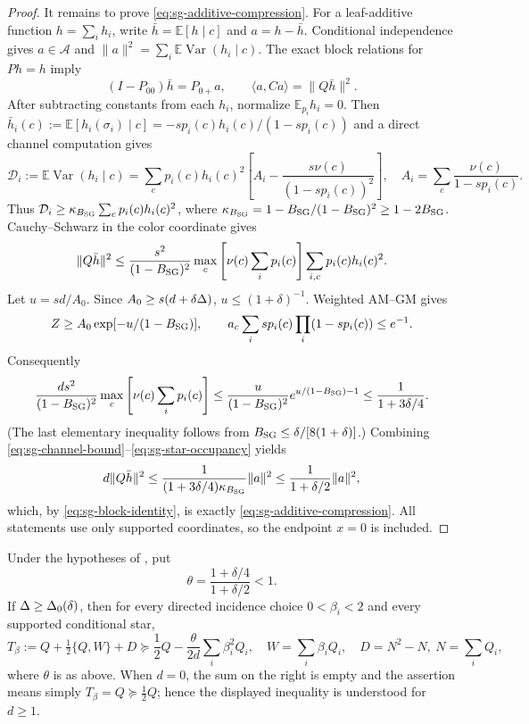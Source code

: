 \begin{proof}
It remains to prove \eqref{eq:sg-additive-compression}.  For a leaf-additive function
$h=\sum_i h_i$, write $\bar h=\mathbb E[h\mid c]$ and $a=h-\bar h$.
Conditional independence gives
$a\in\mathcal A$ and
$\|a\|^2=\sum_i\mathbb E\operatorname{Var}(h_i\mid c)$.  The exact block
relations for $Ph=h$ imply
\begin{equation}\label{eq:sg-block-identity}
 (I-P_{00})\bar h=P_{0+}a,\qquad
 \langle a,Ca\rangle=\|Q\bar h\|^2.
\end{equation}
After subtracting constants from each $h_i$, normalize
$\mathbb E_{p_i}h_i=0$.  Then
$\bar h_i(c):=\mathbb E[h_i(\sigma_i)\mid c]=-sp_i(c)h_i(c)/(1-sp_i(c))$ and a direct channel computation gives
\[
 \mathcal D_i:=\mathbb E\operatorname{Var}(h_i\mid c)
 =\sum_cp_i(c)h_i(c)^2
 \left[A_i-\frac{s\nu(c)}{(1-sp_i(c))^2}\right],\quad
 A_i=\sum_c\frac{\nu(c)}{1-sp_i(c)}.
\]
Thus $\mathcal D_i\ge\kappa_{B_{\rm SG}}\sum_cp_i(c)h_i(c)^2$, where
$\kappa_{B_{\rm SG}}=1-B_{\rm SG}/(1-B_{\rm SG})^2\ge1-2B_{\rm SG}$.  Cauchy--Schwarz in the color coordinate gives
\begin{equation}\label{eq:sg-channel-bound}
 \|Q\bar h\|^2\le \frac{s^2}{(1-B_{\rm SG})^2}
 \max_c\left[\nu(c)\sum_i p_i(c)\right]
 \sum_{i,c}p_i(c)h_i(c)^2.
\end{equation}
Let $u=sd/A_0$.  Since $A_0\ge s(d+\delta\Delta)$,
$u\le(1+\delta)^{-1}$.  Weighted AM--GM gives
\[
 Z\ge A_0\exp[-u/(1-B_{\rm SG})],\qquad
 a_c\sum_i sp_i(c)\prod_i(1-sp_i(c))\le e^{-1}.
\]
Consequently
\begin{equation}\label{eq:sg-star-occupancy}
 \frac{ds^2}{(1-B_{\rm SG})^2}\max_c\left[\nu(c)\sum_i p_i(c)\right]
 \le \frac{u}{(1-B_{\rm SG})^2}e^{u/(1-B_{\rm SG})-1}
 \le \frac{1}{1+3\delta/4}.
\end{equation}
(The last elementary inequality follows from $B_{\rm SG}\le\delta/[8(1+\delta)]$.)
Combining \eqref{eq:sg-channel-bound}--\eqref{eq:sg-star-occupancy} yields
\[
 d\|Q\bar h\|^2\le \frac{1}{(1+3\delta/4)\kappa_{B_{\rm SG}}}\|a\|^2
 \le \frac{1}{1+\delta/2}\|a\|^2,
\]
which, by \eqref{eq:sg-block-identity}, is exactly \eqref{eq:sg-additive-compression}.  All statements use only supported
coordinates, so the endpoint $x=0$ is included.
\end{proof}

\begin{lemma}
\label{lem:girth5-star-incidence}
Under the hypotheses of , put
\[
 \theta=\frac{1+\delta/4}{1+\delta/2}<1.
\]
If $\Delta\ge\Delta_0(\delta)$, then for every directed incidence choice
$0<\beta_i<2$ and every supported conditional star,
\begin{equation}\label{eq:sg-star-incidence}
 T_\beta:=Q+\tfrac12\{Q,W\}+D
 \succeq \frac{1}{2}Q-\frac{\theta}{2d}\sum_i\beta_i^2Q_i,
 \quad W=\sum_i\beta_iQ_i,\quad D=N^2-N,\ N=\sum_iQ_i,
\end{equation}
where $\theta$ is as above.
When $d=0$, the sum on the right is empty and the assertion means simply
$T_\beta=Q\succeq\frac12Q$; hence the displayed inequality is understood for
$d\ge1$.
\end{lemma}

